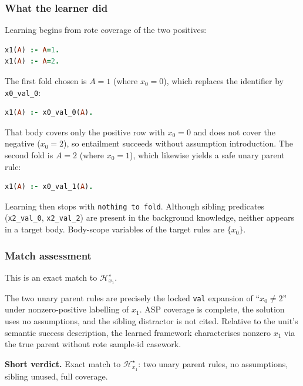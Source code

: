 \documentclass[11pt]{article}
\begin{document}
\subsubsection{What the learner did}

Learning begins from rote coverage of the two positives:

\begin{lstlisting}[style=logic,language=Prolog]
x1(A) :- A=1.
x1(A) :- A=2.
\end{lstlisting}

The first fold chosen is \(A=1\) (where \(x_0=0\)), which replaces the identifier by \texttt{x0\_val\_0}:

\begin{lstlisting}[style=logic,language=Prolog]
x1(A) :- x0_val_0(A).
\end{lstlisting}

That body covers only the positive row with \(x_0=0\) and does not cover the negative (\(x_0=2\)), so entailment succeeds without assumption introduction. The second fold is \(A=2\) (where \(x_0=1\)), which likewise yields a safe unary parent rule:

\begin{lstlisting}[style=logic,language=Prolog]
x1(A) :- x0_val_1(A).
\end{lstlisting}

Learning then stops with \texttt{nothing to fold}. Although sibling predicates (\texttt{x2\_val\_0}, \texttt{x2\_val\_2}) are present in the background knowledge, neither appears in a target body. Body-scope variables of the target rules are \(\{x_0\}\).

\subsubsection{Match assessment}

This is an exact match to \(\mathcal{H}_{x_1}^\star\).

The two unary parent rules are precisely the locked \texttt{val} expansion of ``\(x_0\neq 2\)'' under nonzero-positive labelling of \(x_1\). ASP coverage is complete, the solution uses no assumptions, and the sibling distractor is not cited. Relative to the unit's semantic success description, the learned framework characterises nonzero \(x_1\) via the true parent without rote sample-id casework.

\textbf{Short verdict.} Exact match to \(\mathcal{H}_{x_1}^\star\): two unary parent rules, no assumptions, sibling unused, full coverage.
\end{document}
